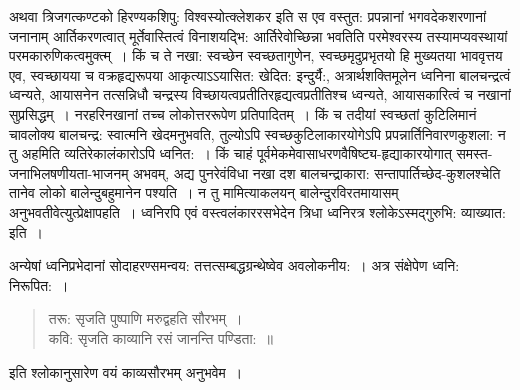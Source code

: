 {अथवा त्रिजगत्कण्टको हिरण्यकशिपु: विश्वस्योत्क्लेशकर इति स एव वस्तुत: प्रपन्नानां भगवदेकशरणानां जनानाम् आर्तिकरणत्वात् मूर्तेवास्तित्वं विनाशयद्भि: आर्तिरेवोच्छिन्ना भवतिति परमेश्वरस्य तस्यामप्यवस्थायां परमकारुणिकत्वमुक्त्म्~। किं च ते नखा: स्वच्छेन स्वच्छतागुणेन, स्वच्छमृदुप्रभृतयो हि मुख्यतया भाववृत्तय एव, स्वच्छायया च वक्रहृद्यरूपया आकृत्याऽऽयासित: खेदित: इन्दुर्यै:, अत्रार्थशक्तिमूलेन ध्वनिना बालचन्द्रत्वं ध्वन्यते, आयासनेन तत्सन्निधौ चन्द्रस्य विच्छायत्वप्रतीतिरहृद्यत्वप्रतीतिश्च ध्वन्यते, आयासकारित्वं च नखानां सुप्रसिद्धम्~। नरहरिनखानां तच्च लोकोत्तररूपेण प्रतिपादितम्~। किं च तदीयां स्वच्छतां कुटिलिमानं चावलोक्य बालचन्द्र: स्वात्मनि खेदमनुभवति, तुल्योऽपि स्वच्छकुटिलाकारयोगेऽपि प्रपन्नार्तिनिवारणकुशला: न तु अहमिति व्यतिरेकालंकारोऽपि ध्वनित:~। किं चाहं पूर्वमेकमेवासाधरणवैषिष्ट्य-हृद्याकारयोगात् समस्त-जनाभिलषणीयता-भाजनम् अभवम्, अद्य पुनरेवंविधा नखा दश बालचन्द्राकारा: सन्तापार्तिच्छेद-कुशलश्चेति तानेव लोको बालेन्दुबहुमानेन पश्यति~। न तु मामित्याकलयन् बालेन्दुरविरतमायासम् अनुभवतीवेत्युत्प्रेक्षापहति~। ध्वनिरपि एवं वस्त्वलंकाररसभेदेन त्रिधा ध्वनिरत्र श्लोकेऽस्मद्गुरुभि: व्याख्यात: इति~। 

अन्येषां ध्वनिप्रभेदानां सोदाहरण्समन्वय: तत्तत्सम्बद्धग्रन्थेष्वेव अवलोकनीय:~। अत्र संक्षेपेण ध्वनि: निरूपित:~। 
\vskip -1cm

\begin{verse}
तरू: सृजति पुष्पाणि मरुद्वहति सौरभम्~। \\
कवि: सृजति काव्यानि रसं जानन्ति पण्डिता:~॥
\end{verse}
इति श्लोकानुसारेण वयं काव्यसौरभम् अनुभवेम~। 
\vskip -10pt

\articleend
}
